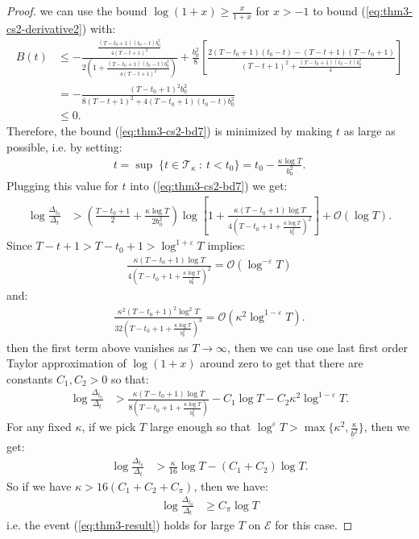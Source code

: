 \begin{proof}
we can use the bound $\log (1+x) \geq \frac{x}{1+x}$ for $x > -1$ to bound (\ref{eq:thm3-cs2-derivative2}) with:
\begin{align*}
    B(t) &\leq -\frac{\frac{(T-t_0+1)(t_0-t)b_0^2}{4(T-t+1)^2}}{2\left(1 +\frac{(T-t_0+1)(t_0-t)b_0^2}{4(T-t+1)^2} \right)} + \frac{b_0^2}{8}\left[\frac{2(T-t_0+1)(t_0-t)-(T-t+1)(T-t_0+1)}{(T-t+1)^2 +\frac{(T-t_0+1)(t_0-t)b_0^2}{4}}\right] \\
    &= -\frac{(T-t_0+1)^2b_0^2}{8(T-t+1)^2 +4(T-t_0+1)(t_0-t)b_0^2} \\
    &\leq 0.
\end{align*}
Therefore, the bound (\ref{eq:thm3-cs2-bd7}) is minimized by making $t$ as large as possible, i.e. by setting: 
\begin{align*}
    t = \sup\;\{t \in \mathcal{T}_{\kappa} \::\: t< t_0\} = t_0 - \frac{\kappa \log T}{b_0^2} \tag{$s_0^2 = 1 \implies f_1(s_0^2) = f_1(s_0^2) =0$}. 
\end{align*}
Plugging this value for $t$ into  (\ref{eq:thm3-cs2-bd7}) we get:
\begin{align}
    \log \frac{\Delta_{t_0}}{\Delta_t} &> \left(\frac{T - t_0 +1}{2} + \frac{\kappa \log T}{2b_0^2}\right)\log\left[1 + \frac{\kappa(T-t_0+1)\log T}{4\left(T-t_0+1 + \frac{\kappa\log T}{b_0^2}\right)^2} \right]+ \mathcal{O}(\log T). \label{eq:thm3-cs2-bd8}
\end{align}
Since $T-t+1 > T-t_0+1 > \log^{1+\varepsilon} T$ implies:
\begin{align*}
    \frac{\kappa(T-t_0+1)\log T}{4\left(T-t_0+1 + \frac{\kappa\log T}{b_0^2}\right)^2} = \mathcal{O}(\log^{-\varepsilon} T)
\end{align*}
and:
\begin{align*}
    \frac{\kappa^2(T-t_0+1)^2\log^2 T}{32\left(T-t_0+1 + \frac{\kappa\log T}{b_0^2}\right)^3} = \mathcal{O}(\kappa^2 \log^{1-\varepsilon} T).
\end{align*}
then the first term above vanishes as $T\to\infty$, then we can use one last first order Taylor approximation of $\log(1+x)$ around zero to get that there are constants $C_1,C_2>0$ so that: 
\begin{align*}
    \log \frac{\Delta_{t_0}}{\Delta_t} &> \frac{\kappa(T-t_0+1)\log T}{8\left(T-t_0+1 + \frac{\kappa\log T}{b_0^2}\right)}- C_1\log T - C_2 \kappa^2\log^{1-\varepsilon} T.
\end{align*}
For any fixed $\kappa$, if we pick $T$ large enough so that $\log^\varepsilon T > \max\{\kappa^2, \frac{\kappa}{\underline{b}^2}\}$, then we get:
\begin{align*}
    \log \frac{\Delta_{t_0}}{\Delta_t} &> \frac{\kappa}{16}\log T - (C_1 + C_2)\log T.
\end{align*}
So if we have $\kappa > 16 (C_1 + C_2+ C_\pi)$, then we have:
\begin{align*}
    \log \frac{\Delta_{t_0}}{\Delta_t} &\geq C_\pi \log T
\end{align*}
i.e. the event (\ref{eq:thm3-result}) holds for large $T$ on $\mathcal{E}$ for this case.

\end{proof}